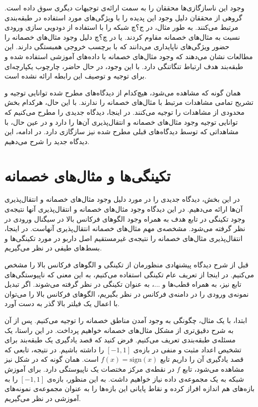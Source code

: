 \documentclass[12pt,onecolumn,a4paper]{article}
\begin{document}
وجود این ناسازگازی‌ها محققان را به سمت ارائه‌ی توجیهات دیگری سوق داده است. گروهی از محققان دلیل وجود این پدیده را با ویژگی‌های مورد استفاده در طبقه‌بندی مرتبط می‌کنند. به طور مثال، در ج؟چ شبکه را با استفاده از دودویی سازی ورودی نسبت به مثال‌های خصمانه مقاوم کردند. یا در چ؟چ دلیل وجود مثال‌های خصمانه را حضور ویژگی‌های ناپایداری می‌دانند که با برچسب خروجی همبستگی دارند. این مطالعات نشان می‌دهند که وجود مثال‌های خصمانه با داده‌های آموزشی استفاده شده و طبقه‌بند هدف ارتباط تنگاتنگی دارد. با این وجود، در حال حاضر، چارچوب یکپارچه‌ای برای توجیه و توصیف این رابطه ارائه نشده است.

همان گونه که مشاهده می‌شود، هیچ‌کدام از دیدگاه‌های مطرح شده توانایی توجیه و تشریح تمامی مشاهدات مرتبط با مثال‌های خصمانه را ندارند. با این حال، هرکدام بخش محدودی از مشاهدات را توجیه می‌کنند. در اینجا، دیدگاه جدیدی را مطرح می‌کنیم که توانایی توجیه وجود مثال‌های خصمانه و انتقال‌پذیری آن‌ها را دارد و  در عین حال، با مشاهداتی که توسط دیدگاه‌های قبلی مطرح شده نیز سازگازی دارد. در ادامه، این دیدگاه جدید را شرح می‌دهیم.

\section{تکینگی‌ها و مثال‌های خصمانه}
در این بخش، دیدگاه جدیدی را در مورد دلیل وجود مثال‌های خصمانه و انتقال‌پذیری آن‌ها ارائه می‌دهیم. در این دیدگاه وجود مثال‌های خصمانه و انتقال‌پذیری آنها نتیجه‌ی وجود تکینگی در تابع هدف به همراه وجود الگوهای فرکانس بالا در سیگنال ورودی در نظر گرفته می‌شود. مشخصه‌ی مهم مثال‌های خصمانه انتقال‌پذیری آنهاست. در اینجا، انتقال‌پذیری مثال‌های خصمانه را نتیجه‌ی غیرمستقیم اصل داربو در مورد تکینگی‌ها و بسط‌های طیفی در نظر می‌گیریم.

قبل از شرح دیدگاه پیشنهادی منظورمان از تکینگی و الگوهای فرکانس بالا را مشخص می‌کنیم. در اینجا از تعریف عام تکینگی استفاده می‌کنیم، به این معنی که ناپیوستگی‌های تابع نیز، به همراه قطب‌ها و ...، به عنوان تکینگی  در نظر گرفته می‌شوند. اگر تبدیل نمونه‌ی ورودی را در دامنه‌ی فرکانس در نظر بگیریم، الگوهای فرکانس بالا را می‌توان با اعمال یک  فیلتر بالا گذر به دست آورد.

ابتدا، با یک مثال، چگونگی به وجود آمدن مناطق خصمانه را توجیه می‌کنیم. پس از آن به شرح دقیق‌تری از مشکل مثال‌های خصمانه خواهیم پرداخت. در این راستا، یک مسئله‌ی طبقه‌بندی تعریف می‌کنیم. فرض کنید که قصد یادگیری یک طبقه‌بند برای تشخیص اعداد مثبت و منفی در بازه‌ی 
$[-1,1]$ 
را داشته باشیم. در نتیجه، تابعی که قصد یادگیری آن را داریم تابع 
$f(x)=\mathrm{sign}(x)$ 
است. همان گونه که در شکل نیز مشاهده می‌شود، تابع 
$f$ 
در نقطه‌ی مرکز مختصات یک ناپیوستگی دارد. برای آموزش شبکه به یک مجموعه‌ی داده نیاز خواهیم داشت. به این منظور، بازه‌ی 
$[-1,1]$ 
را به بازه‌های هم اندازه افراز کرده و نقاط پایانی این بازه‌ها را به عنوان مجموعه‌ی نمونه‌های آموزشی در نظر می‌گیریم.
\end{document}
